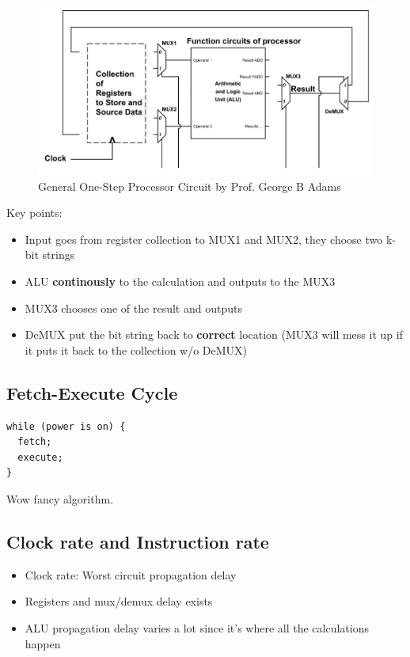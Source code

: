 \documentclass[11pt]{article}
\begin{document}
\begin{figure}[htbp]
\centering
\includegraphics[width=.9\linewidth]{./img/general_one_step_processor_circuit.jpg}
\caption{\label{fig:orged379a6}General One-Step Processor Circuit by Prof. George B Adams}
\end{figure}

Key points:
\begin{itemize}
\item Input goes from register collection to MUX1 and MUX2, they choose two k-bit strings
\item ALU \textbf{continously} to the calculation and outputs to the MUX3
\item MUX3 chooses one of the result and outputs
\item DeMUX put the bit string back to \textbf{correct} location (MUX3 will mess it up if it puts it back to the collection w/o DeMUX)
\end{itemize}

\subsection{Fetch-Execute Cycle}
\label{sec:org0e15b55}

\begin{verbatim}
while (power is on) {
  fetch;
  execute;
}
\end{verbatim}

Wow fancy algorithm.

\subsection{Clock rate and Instruction rate}
\label{sec:orgafbed03}

\begin{itemize}
\item Clock rate: Worst circuit propagation delay
\item Registers and mux/demux delay exists
\item ALU propagation delay varies a lot since it's where all the calculations happen
\end{itemize}
\end{document}
